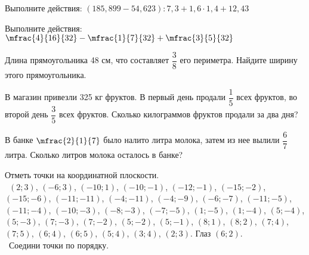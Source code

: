 \begin{exam}
	\begin{listofex}
		\item Выполните действия: \( (185,899-54,623):7,3+1,6\cdot1,4+12,43 \)
		\item Выполните действия: \( \mfrac{4}{16}{32}-\mfrac{1}{7}{32}+\mfrac{3}{5}{32} \)
		\item Длина прямоугольника 48 см, что составляет \( \dfrac{3}{8} \) его периметра. Найдите ширину этого прямоугольника.
		\item В магазин привезли 325 кг фруктов. В первый день продали \( \dfrac{1}{5} \) всех фруктов, во второй день \( \dfrac{3}{5} \)  всех фруктов. Сколько килограммов фруктов продали за два дня?
		\item В банке \( \mfrac{2}{1}{7} \) было налито   литра молока, затем из нее вылили  \( \dfrac{6}{7} \) литра. Сколько литров молока осталось в банке?
		\item Отметь точки на координатной плоскости.\\\ \( (2; 3) \), \( (-6; 3) \), \( (-10; 1) \), \( (-10; -1) \), \( (-12; -1) \), \( (-15; -2) \), \( (-15; -6) \), \( (-11; -11) \), \( (-4; -11) \), \( (-4; -9) \), \( (-6;-7) \), \( (-11; -5) \), \( (-11; -4) \), \( (-10;-3) \), \( (-8; -3) \), \( (-7; -5) \), \( (1; -5) \), \( (1; -4) \), \( (5; -4) \), \( (5; -3) \), \( (7; -3) \), \( (7; -2) \), \( (5; -2) \), \( (5; -1) \), \( (8; 1) \), \( (8; 2) \), \( (7; 4) \), \( (7; 5) \), \( (6; 4) \), \( (6; 5) \), \( (5; 4) \), \( (3; 4) \), \( (2; 3) \). Глаз \( (6; 2) \).\\\ Соедини точки по порядку.
	\end{listofex}
\end{exam}

